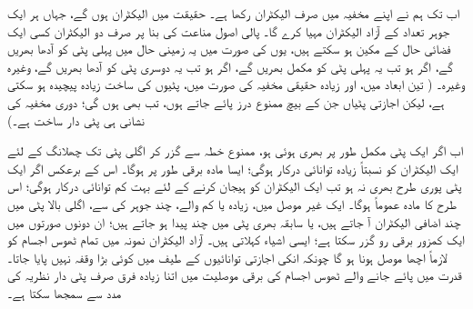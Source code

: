  اب تک ہم نے اپنے مخفیہ میں صرف  الیکٹران رکھا ہے۔ حقیقت میں  الیکٹران ہوں گے، جہاں ہر ایک جوہر  تعداد کے آزاد الیکٹران مہیا کرے گا۔ پالی اصول مناعت کی بنا پر صرف دو الیکٹران کسی ایک فضائی حال کے مکین ہو سکتے ہیں، یوں  کی صورت میں یہ زمینی حال میں پہلی پٹی کو آدھا بھریں گے، اگر  ہو تب یہ پہلی پٹی کو مکمل بھریں گے، اگر  ہو تب یہ دوسری پٹی کو آدھا بھریں گے، وغیرہ وغیرہ۔ ( تین ابعاد میں، اور زیادہ حقیقی مخفیہ کی صورت میں، پٹیوں کی ساخت زیادہ پیچیدہ ہو سکتی ہے، لیکن اجازتی پٹیاں جن کے بیچ ممنوع درز پائے جاتے ہوں، تب بھی ہوں گی؛ دوری مخفیہ کی نشانی ہی پٹی دار ساخت ہے۔)
 
 اب اگر ایک پٹی مکمل طور پر بھری ہوئی ہو، ممنوع خطہ سے گزر کر اگلی پٹی تک چھلانگ کے لئے ایک الیکٹران کو نسبتاً زیادہ توانائی درکار ہوگی؛ ایسا مادہ برقی طور پر  ہوگا۔ اس کے برعکس اگر ایک پٹی پوری طرح بھری نہ ہو تب ایک الیکٹران کو ہیجان کرنے کے لئے بہت کم توانائی درکار ہوگی؛ اس طرح کا مادہ عموماً  ہوگا۔ ایک غیر موصل میں، زیادہ یا کم  والے، چند جوہر کی سے، اگلی بالا پٹی میں چند اضافی الیکٹران آ جاتے ہیں، یا سابقہ بھری پٹی میں چند  پیدا ہو جاتے ہیں؛ ان دونوں صورتوں میں ایک کمزور برقی رو گزر سکتا ہے؛ ایسی اشیاء  کہلاتی ہیں۔ آزاد الیکٹران نمونہ میں تمام ٹھوس اجسام کو لازماً اچھا موصل ہونا ہو گا چونکہ انکی اجازتی توانائیوں کے طیف میں کوئی بڑا وقفہ نہیں پایا جاتا۔ قدرت میں پائے جانے والے ٹھوس اجسام کی برقی موصلیت میں اتنا زیادہ فرق صرف پٹی دار نظریہ کی مدد سے سمجھا سکتا ہے۔ 

